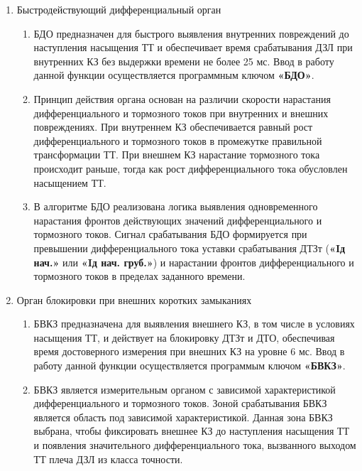 \begin{enumerate}
\item Быстродействующий дифференциальный орган
\begin{enumerate}
\item БДО предназначен для быстрого выявления внутренних повреждений до наступления насыщения ТТ и обеспечивает время срабатывания ДЗЛ при внутренних КЗ без выдержки времени не более 25 мс. Ввод в работу данной функции осуществляется программным ключом \textbf{«БДО»}.
\item Принцип действия органа основан на различии скорости нарастания дифференциального и тормозного токов при внутренних и внешних повреждениях. При внутреннем КЗ обеспечивается равный рост дифференциального и тормозного токов в промежутке правильной трансформации ТТ. При внешнем КЗ нарастание тормозного тока происходит раньше, тогда как рост дифференциального тока обусловлен насыщением ТТ.
\item В алгоритме БДО реализована логика выявления одновременного нарастания фронтов действующих значений дифференциального и тормозного токов. Сигнал срабатывания БДО формируется при превышении дифференциального тока уставки срабатывания ДТЗт (\textbf{«Iд нач.»} или \textbf{«Iд нач. груб.»}) и нарастании фронтов дифференциального и тормозного токов в пределах заданного времени.
\end{enumerate}

\item Орган блокировки при внешних коротких замыканиях

\begin{enumerate}

\item БВКЗ предназначена для выявления внешнего КЗ, в том числе в условиях насыщения ТТ, и действует на блокировку ДТЗт и ДТО, обеспечивая время достоверного измерения при внешних КЗ на уровне 6 мс. Ввод в работу данной функции осуществляется программым ключом \textbf{«БВКЗ»}.

\item БВКЗ является измерительным органом с зависимой характеристикой дифференциального и тормозного токов. Зоной срабатывания БВКЗ является область под зависимой характеристикой. Данная зона БВКЗ выбрана, чтобы фиксировать внешнее КЗ до наступления насыщения ТТ и появления значительного дифференциального тока, вызванного выходом ТТ плеча ДЗЛ из класса точности.


\end{enumerate}
\end{enumerate}
